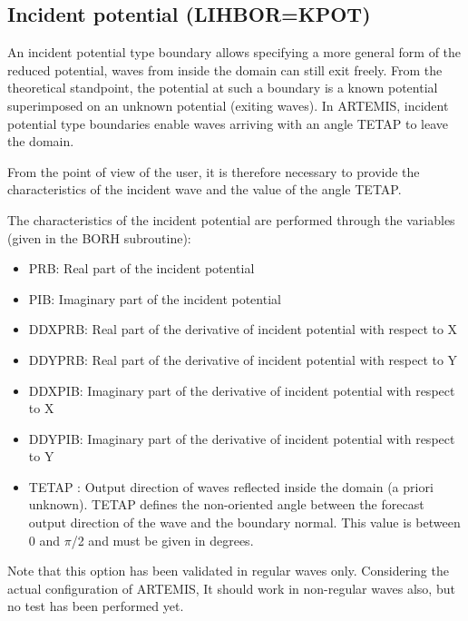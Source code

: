\subsection{Incident potential (LIHBOR=KPOT)}

An incident potential type boundary allows specifying a more general form of
the reduced potential, waves from inside the domain can still exit freely. From
the theoretical standpoint, the potential at such a boundary is a known
potential superimposed on an unknown potential (exiting waves). In ARTEMIS,
incident potential type boundaries enable waves arriving with an angle TETAP to
leave the domain.

From the point of view of the user, it is therefore necessary to provide the
characteristics of the incident wave and the value of the angle TETAP.

The characteristics of the incident potential are performed through the
variables (given in the BORH subroutine):

\begin{itemize}
  \item PRB:  Real part of the incident potential

  \item PIB: Imaginary part of the incident potential

  \item DDXPRB:  Real part of the derivative of incident
    potential with respect to X

  \item DDYPRB:  Real part of the derivative of incident
    potential with respect to Y

  \item DDXPIB:  Imaginary part of the derivative of incident
    potential with respect to X

  \item DDYPIB:  Imaginary part of the derivative of incident
    potential with respect to Y

  \item TETAP : Output direction of waves reflected inside the domain (a priori
    unknown). TETAP defines the non-oriented angle between the forecast output
    direction of the wave and the boundary normal. This value is between 0 and
    $\pi$/2 and must be given in degrees.

\end{itemize}

Note that this option has been validated in regular waves only. Considering the actual configuration of ARTEMIS, It should work in non-regular waves also, but no test has been performed yet.


